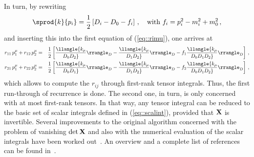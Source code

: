 In turn, by rewriting
%
\begin{equation}\label{eq::scalprod}
\sprod{k}{p_i} = {1\over 2}\left[D_i - D_0 - f_i\right]\,,\quad
\mbox{with } f_i = p_i^2 - m_i^2 + m_0^2\,,
\end{equation}
%
and inserting this into the first equation of (\ref{eq::rimu}), one
arrives at
%
\begin{eqnarray}
r_{11}\,p_1^\mu + r_{12}\,p_2^\mu &=& {1\over 2}\left[
\llangle{k_\mu\over D_0 D_2}\rrangle_D -
\llangle{k_\mu\over D_1 D_2}\rrangle_D -
f_1 \llangle{k_\mu\over D_0 D_1 D_2}\rrangle_D\right]\,,
\nonumber\\
r_{21}\,p_1^\mu + r_{22}\,p_2^\mu &=& {1\over 2}\left[
\llangle{k_\mu\over D_0 D_1}\rrangle_D -
\llangle{k_\mu\over D_1 D_2}\rrangle_D -
f_2 \llangle{k_\mu\over D_0 D_1 D_2}\rrangle_D\right]\,,
\end{eqnarray}
%
which allows to compute the $r_{ij}$ through first-rank tensor
integrals.  Thus, the first run-through of recurrence is done. The
second one, in turn, is only concerned with at most first-rank tensors.
In that way, any tensor integral can be reduced to the basic set of
scalar integrals defined in (\ref{eq::scalint}), provided that ${\bf X}$
is invertible.  Several improvements to the original algorithm concerned
with the problem of vanishing $\det{\bf X}$ and also with the numerical
evaluation of the scalar integrals have been worked
out~\cite{Stu88,OldVer89}. An overview and a complete list of references
can be found in~\cite{Stu98}.

